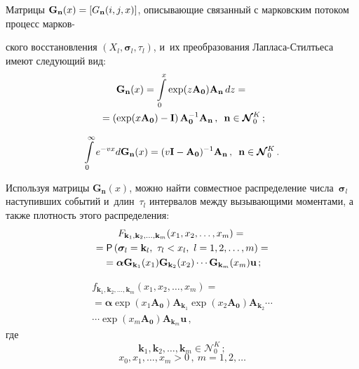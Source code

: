{\begin{multicols}{2}
  Матрицы $\mathbf{G}_{\mathbf{n}}(x)\hm= [G_{\mathbf{n}}(i,j,x)]$, 
описывающие связанный с марковским потоком процесс марков-\linebreak\vspace*{-12pt}

\pagebreak

\noindent
ского 
восстановления $(X_l, \boldsymbol{\sigma}_l,\tau_l)$,  и~их преобразования 
Лап\-ла\-са-Стилть\-еса имеют следующий вид:
\begin{multline}
  \mathbf{G}_{\mathbf{n}}(x) = \int\limits_0^x \exp 
(z\mathbf{A}_{\mathbf{0}}) \mathbf{A}_{\mathbf{n}}\,dz={}\\
{}= \left( \exp 
(x\mathbf{A}_{\mathbf{0}})-\mathbf{I}\right) \mathbf{A}_{\mathbf{0}}^{-1} 
\mathbf{A}_{\mathbf{n}}\,,\enskip
  \mathbf{n}\in \boldsymbol{\mathcal{N}}_0^K\,;
  \label{e24-n}
  \end{multline}
  
  \noindent
  \begin{equation*}
  \int\limits_0^\infty e^{-vx} d\mathbf{G}_{\mathbf{n}}(x) = (v\mathbf{I}-
\mathbf{A}_{\mathbf{0}})^{-1} \mathbf{A}_{\mathbf{n}}\,,\enskip
  \mathbf{n}\in \boldsymbol{\mathcal{N}}_0^K\,.
  \end{equation*}
  
  Используя матрицы $\mathbf{G}_{\mathbf{n}}(x)$, можно найти совместное 
распределение числа~$\boldsymbol{\sigma}_l$ наступивших событий 
и~длин~$\tau_l$ интервалов между вызывающими моментами, а также 
плотность этого распределения: 
  \begin{multline}
F_{\mathbf{k}_1, \mathbf{k}_2, \ldots , \mathbf{k}_m}(x_1, x_2,\ldots , x_m) ={}\\
{}=  {\sf P} \left(\boldsymbol{\sigma}_l=\mathbf{k}_l,\ \tau_l<x_l,\ l=1,2,\ldots , 
m\right)={}\\
{}=  \boldsymbol{\alpha}\mathbf{G}_{\mathbf{k}_1}(x_1) 
\mathbf{G}_{\mathbf{k}_2}(x_2)\cdots \mathbf{G}_{\mathbf{k}_m}(x_m) 
\mathbf{u}\,;
  \label{e26-n}
  \end{multline}
  
  \vspace*{-12pt}
  
  \noindent
  \begin{multline*}
  f_{\mathbf{k}_1, \mathbf{k}_2,\ldots , 
  \mathbf{k}_m}(x_1,x_2,\ldots , x_m) ={}\\ 
{}=\boldsymbol{\alpha}\exp (x_1\mathbf{A}_{\mathbf{0}}) \mathbf{A}_{\mathbf{k}_1}\exp (
x_2 \mathbf{A}_{\mathbf{0}}) \mathbf{A}_{\mathbf{k}_2}\cdots{}\\
{}\cdots  \exp 
(x_m\mathbf{A}_{\mathbf{0}})\mathbf{A}_{\mathbf{k}_m} \mathbf{u}\,,
  \end{multline*}
  где
  $$
  \mathbf{k}_1, \mathbf{k}_2, \ldots , \mathbf{k}_m\in 
\boldsymbol{\mathcal{N}}_0^K\,;
$$
$$ x_0, x_1, \ldots , x_m>0\,,\ m=1,2,\ldots
  $$
  

\end{multicols}}
